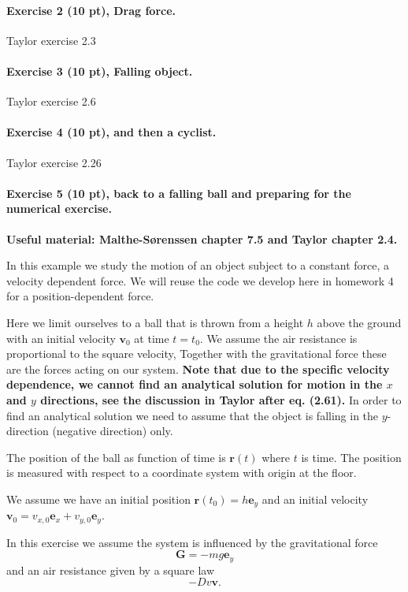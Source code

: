 \documentclass[%
oneside,                 %
final,                   %
10pt]{article}
\begin{document}
\noindent
\paragraph{Exercise 2 (10 pt), Drag force.}
Taylor exercise 2.3

\paragraph{Exercise 3 (10 pt), Falling object.}
Taylor exercise 2.6

\paragraph{Exercise 4 (10 pt), and then a cyclist.}
Taylor exercise 2.26

\paragraph{Exercise 5 (10 pt), back to a falling ball and preparing for the numerical exercise.}
\textbf{Useful material: Malthe-Sørenssen chapter 7.5 and Taylor chapter 2.4.}

In this example we study the motion of an object subject to a constant force, a velocity dependent
force. We will  reuse the code we develop here in homework 4 for a position-dependent force.

Here we limit ourselves to a ball that is thrown from a height $h$
above the ground with an initial velocity
$\bm{v}_0$ at time $t=t_0$. We assume the air resistance is proportional  to the square velocity, Together with the gravitational force these are the forces acting on our system.
\textbf{Note that due to the specific velocity dependence, we cannot find an analytical solution for motion in the $x$ and $y$ directions, see the discussion in Taylor after eq. (2.61).}
In order to find an analytical solution we need to assume that the object is falling in the $y$-direction (negative direction) only. 

The position of the ball as function of time is  $\bm{r}(t)$ where $t$ is time.
 The position is measured with respect to a coordinate system with origin at the floor.

We assume we have an initial position $\bm{r}(t_0)=h\bm{e}_y$ and an initial velocity $\bm{v}_0=v_{x,0}\bm{e}_x+v_{y,0}\bm{e}_y$.

In this exercise we assume the system is influenced by the gravitational force
\[
\bm{G}=-mg\bm{e}_y
\]
and an air resistance given by a square law
\[
-Dv\bm{v}.
\]
\end{document}
